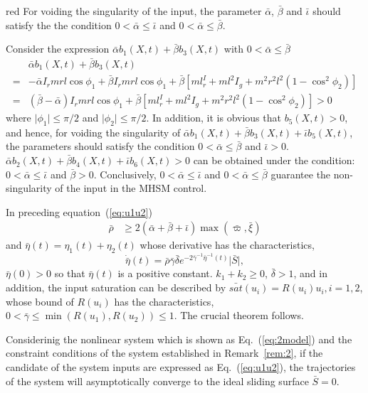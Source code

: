 \begin{color}{red}
For voiding the singularity of the input, the parameter $\bar\alpha$, $\bar\beta$ and $\bar\iota$ should satisfy the the condition $0<\bar\alpha\le\bar\iota$ and $0<\bar\alpha\le\bar\beta$.\par
    Consider the expression $\bar\alpha b_1(X,t) + \bar\beta b_3(X,t)$ with $0<\bar\alpha\le \bar\beta$
    \begin{align*}
    &\bar\alpha b_1(X,t) + \bar\beta b_3(X,t)\\
    =&-\bar\alpha I_rmrl\cos\phi_1 + \bar\beta I_rmrl\cos\phi_1+\bar\beta[ml^I_r+ml^2I_g+m^2r^2l^2(1-\cos^2\phi_2)]\\
    =&(\bar\beta-\bar\alpha) I_rmrl\cos\phi_1+\bar\beta[ml^I_r+ml^2I_g+m^2r^2l^2(1-\cos^2\phi_2)]>0
    \end{align*}
    where $\vert\phi_1\vert\le\pi/2$ and $\vert\phi_2\vert\le\pi/2$.
    In addition, it is obvious that $b_5(X,t)>0$, and hence, for voiding the singularity of $\bar\alpha b_1(X,t) + \bar\beta b_3(X,t) + \bar\iota b_5(X,t)$,  the parameters should satisfy the condition $0<\bar\alpha\le\bar\beta$ and $\bar\iota>0$. $\bar\alpha b_2(X,t) + \bar\beta b_4(X,t) + \bar\iota b_6(X,t)>0$ can be obtained under the condition: $0<\bar\alpha\le\bar\iota$ and $\bar\beta>0$. Conclusively, $0<\bar\alpha\le\bar\iota$ and $0<\bar\alpha\le\bar\beta$ guarantee the non-singularity of the input in the MHSM control.
\end{color}
In preceding equation~(\ref{eq:u1u2})
\begin{align}
\bar\rho &\ge 2(\bar\alpha + \bar\beta + \bar\iota)\max(\bar\varpi,\bar\xi)
\end{align}
and $\bar\eta(t)=\eta_1(t)+\eta_2(t)$ whose derivative has the characteristics, $$\dot{{\bar\eta}}(t) = \bar\rho\bar\gamma\bar\delta e^{-2\bar\gamma^{-1}{\bar\eta}^{-1}(t)}\vert \bar S\vert,$$ $\bar\eta(0) > 0$ so that $\bar\eta(t)$ is a positive constant. $k_1+k_2\ge 0$, $\bar\delta >1$, and in addition, the input saturation can be described by $\bar{sat}(u_i) = R(u_i)u_i, i =1,2$, whose bound of $R(u_i)$ has the characteristics, $0<\bar\gamma\le \min(R(u_1),R(u_2))\le 1$. The crucial theorem follows.
\begin{theorem}
Considerinig the nonlinear system which is shown as Eq.~(\ref{eq:2model}) and the constraint conditions of the system established in Remark~\ref{rem:2}, if the candidate of the system inputs are expressed as Eq.~(\ref{eq:u1u2}), the trajectories of the system will asymptotically converge to the ideal sliding surface $\bar S=0$.\label{theorem:3}
\end{theorem}
